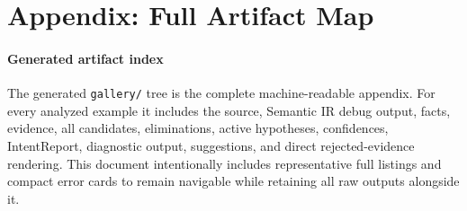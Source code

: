\documentclass[10pt,a4paper]{article}
\newcommand{\artifact}[2]{\paragraph{#1}}
\begin{document}
\section{Appendix: Full Artifact Map}

\artifact{Generated artifact index}{../gallery/index.json}

The generated \texttt{gallery/} tree is the complete machine-readable appendix.
For every analyzed example it includes the source, Semantic IR debug output,
facts, evidence, all candidates, eliminations, active hypotheses, confidences,
IntentReport, diagnostic output, suggestions, and direct rejected-evidence
rendering. This document intentionally includes representative full listings
and compact error cards to remain navigable while retaining all raw outputs
alongside it.
\end{document}
